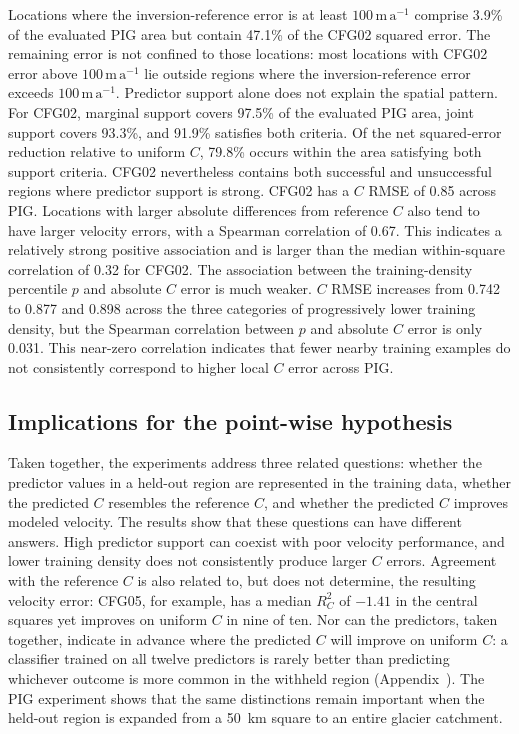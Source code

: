 \documentclass[review,jog]{igs}
\begin{document}
Locations where the inversion-reference error is at least $100\,\mathrm{m\,a^{-1}}$ comprise 3.9\% of the evaluated PIG area but contain 47.1\% of the CFG02 squared error. The remaining error is not confined to those locations: most locations with CFG02 error above $100\,\mathrm{m\,a^{-1}}$ lie outside regions where the inversion-reference error exceeds $100\,\mathrm{m\,a^{-1}}$. Predictor support alone does not explain the spatial pattern. For CFG02,
marginal support covers 97.5\% of the evaluated PIG area, joint support covers
93.3\%, and 91.9\% satisfies both criteria. Of the net squared-error reduction
relative to uniform $C$, 79.8\% occurs within the area satisfying both support
criteria. CFG02 nevertheless contains both successful and unsuccessful regions
where predictor support is strong.
CFG02 has a $C$ RMSE of 0.85 across PIG. Locations with larger absolute differences from reference $C$ also tend to have larger velocity errors, with a Spearman correlation of 0.67. This indicates a relatively strong positive association and is larger than the median within-square correlation of 0.32 for CFG02. The association between the training-density percentile $p$ and absolute $C$ error is much weaker. $C$ RMSE increases from 0.742 to 0.877 and 0.898 across the three categories of progressively lower training density, but the Spearman correlation between $p$ and absolute $C$ error is only 0.031. This near-zero correlation indicates that fewer nearby training examples do not consistently correspond to higher local $C$ error across PIG.



\subsection{Implications for the point-wise hypothesis}

Taken together, the experiments address three related questions: whether the
predictor values in a held-out region are represented in the training data,
whether the predicted $C$ resembles the reference $C$, and whether the
predicted $C$ improves modeled velocity. The results show that these questions
can have different answers. High predictor support can coexist with poor
velocity performance, and lower training density does not consistently
produce larger $C$ errors. Agreement with the reference $C$ is also related to,
but does not determine, the resulting velocity error: CFG05, for example, has a median $R_C^2$ of $-1.41$ in the central squares yet improves on uniform $C$ in nine of ten. Nor can the predictors,
taken together, indicate in advance where the predicted $C$ will improve on
uniform $C$: a classifier trained on all twelve predictors is rarely better than
predicting whichever outcome is more common in the withheld region (Appendix~). The PIG experiment shows
that the same distinctions remain important when the held-out region is
expanded from a 50~km square to an entire glacier catchment.
\end{document}
